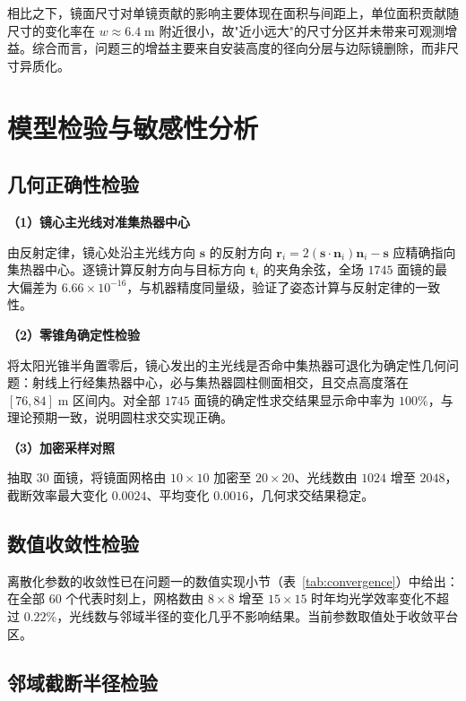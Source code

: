 \documentclass[12pt,a4paper,fontset=fandol]{ctexart}
\begin{document}
相比之下，镜面尺寸对单镜贡献的影响主要体现在面积与间距上，单位面积贡献随尺寸的变化率在 $w \approx 6.4\;\mathrm{m}$ 附近很小，故"近小远大"的尺寸分区并未带来可观测增益。综合而言，问题三的增益主要来自安装高度的径向分层与边际镜删除，而非尺寸异质化。

\section{模型检验与敏感性分析}

\subsection{几何正确性检验}

\textbf{（1）镜心主光线对准集热器中心}

由反射定律，镜心处沿主光线方向 $\mathbf{s}$ 的反射方向 $\mathbf{r}_i = 2(\mathbf{s}\cdot\mathbf{n}_i)\mathbf{n}_i - \mathbf{s}$ 应精确指向集热器中心。逐镜计算反射方向与目标方向 $\mathbf{t}_i$ 的夹角余弦，全场 $1745$ 面镜的最大偏差为 $6.66\times10^{-16}$，与机器精度同量级，验证了姿态计算与反射定律的一致性。

\textbf{（2）零锥角确定性检验}

将太阳光锥半角置零后，镜心发出的主光线是否命中集热器可退化为确定性几何问题：射线上行经集热器中心，必与集热器圆柱侧面相交，且交点高度落在 $[76, 84]\;\mathrm{m}$ 区间内。对全部 $1745$ 面镜的确定性求交结果显示命中率为 $100\%$，与理论预期一致，说明圆柱求交实现正确。

\textbf{（3）加密采样对照}

抽取 $30$ 面镜，将镜面网格由 $10\times10$ 加密至 $20\times20$、光线数由 $1024$ 增至 $2048$，截断效率最大变化 $0.0024$、平均变化 $0.0016$，几何求交结果稳定。

\subsection{数值收敛性检验}

离散化参数的收敛性已在问题一的数值实现小节（表~\ref{tab:convergence}）中给出：在全部 $60$ 个代表时刻上，网格数由 $8\times8$ 增至 $15\times15$ 时年均光学效率变化不超过 $0.22\%$，光线数与邻域半径的变化几乎不影响结果。当前参数取值处于收敛平台区。

\subsection{邻域截断半径检验}
\end{document}
